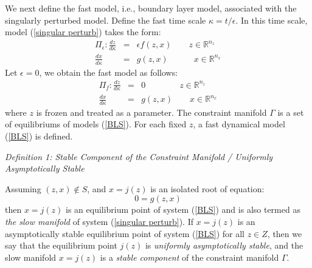 \documentclass[journal]{IEEEtran}
\newcommand{\ee}{\epsilon}
\begin{document}
We next define the fast model, i.e., boundary layer model, associated with the singularly perturbed model. Define the fast time scale $\kappa=t/\ee$. In this time scale, model (\ref{singular perturb}) takes the form:
\begin{eqnarray}\label{singular perturb in kappa}
\Pi_\ee:\frac{dz}{d\kappa}&=&{\ee}f(z,x)\qquad z\in\mathbb{R}^{n_z}\\
\frac{dx}{d\kappa}&=&g(z,x)\qquad\quad x\in\mathbb{R}^{n_x}\nonumber
\end{eqnarray}
Let $\ee=0$, we obtain the fast model as follows:
\begin{eqnarray}\label{BLS}
\Pi_f:\frac{dz}{d\kappa}&=&0\qquad \qquad z\in\mathbb{R}^{n_z}\\
\frac{dx}{d\kappa}&=&g(z,x)\qquad x\in\mathbb{R}^{n_x}\nonumber
\end{eqnarray}
where $z$ is frozen and treated as a parameter. The constraint manifold $\Gamma$ is a set of equilibriums of models (\ref{BLS}). For each fixed $z$, a fast dynamical model (\ref{BLS}) is defined.


\noindent\textit{Definition 1: Stable Component of the Constraint Manifold / Uniformly Asymptotically Stable}

Assuming $(z,x)\notin S$, and $x=j(z)$ is an isolated root of equation:
\begin{equation}\label{BLSsep}
0=g(z,x)
\end{equation}
then $x=j(z)$ is an equilibrium point of system (\ref{BLS}) and is also termed as \textit{the slow manifold} of system (\ref{singular perturb}). If $x=j(z)$ is an asymptotically stable equilibrium point of system (\ref{BLS}) for all $z\in Z$, then we say that the equilibrium point $j(z)$ is \textit{uniformly asymptotically stable}, and the slow manifold $x=j(z)$ is a \textit{stable component} of the constraint manifold $\Gamma$.
\end{document}
